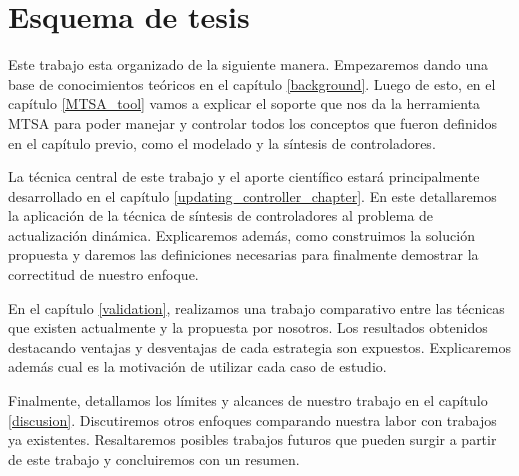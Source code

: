 \section{Esquema de tesis}

Este trabajo esta organizado de la siguiente manera. Empezaremos dando una base de conocimientos teóricos en el capítulo
\ref{background}. Luego de esto, en el capítulo \ref{MTSA_tool} vamos a explicar el soporte que nos da la herramienta
MTSA para poder manejar y controlar todos los conceptos que fueron definidos en el capítulo previo, como el modelado y
la síntesis de controladores.

La técnica central de este trabajo y el aporte científico estará principalmente desarrollado en el capítulo
\ref{updating_controller_chapter}. En este detallaremos la aplicación de la técnica de síntesis de controladores al
problema de actualización dinámica. Explicaremos además, como construimos la solución propuesta y daremos las
definiciones necesarias para finalmente demostrar la correctitud de nuestro enfoque.

En el capítulo \ref{validation}, realizamos una trabajo comparativo entre las técnicas que existen actualmente y la propuesta por
nosotros. Los resultados obtenidos destacando ventajas y desventajas de cada estrategia son expuestos. Explicaremos
además cual es la motivación de utilizar cada caso de estudio.

Finalmente, detallamos los límites y alcances de nuestro trabajo en el capítulo \ref{discusion}. Discutiremos otros
enfoques comparando nuestra labor con trabajos ya existentes. Resaltaremos posibles trabajos futuros que pueden surgir a
partir de este trabajo y concluiremos con un resumen.

